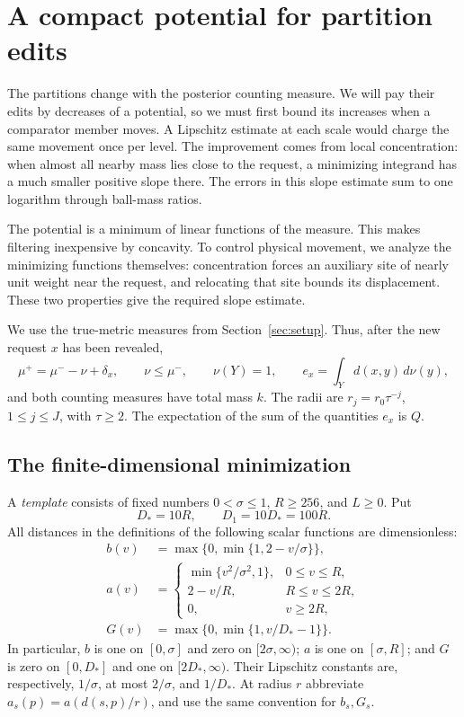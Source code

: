 \section{A compact potential for partition edits}
\label{sec:pilot}

The partitions change with the posterior counting measure.  We will pay
their edits by decreases of a potential, so we must first bound its increases
when a comparator member moves.  A Lipschitz estimate at each scale would
charge the same movement once per level.  The improvement comes from local
concentration: when almost all nearby mass lies close to the request, a
minimizing integrand has a much smaller positive slope there.  The errors
in this slope estimate sum to one logarithm through ball-mass ratios.

The potential is a minimum of linear functions of the measure.  This
makes filtering inexpensive by concavity.  To control physical movement,
we analyze the minimizing functions themselves: concentration forces an
auxiliary site of nearly unit weight near the request, and relocating
that site bounds its displacement.  These two properties give the required
slope estimate.

We use the true-metric measures from Section~\ref{sec:setup}.  Thus, after
the new request $x$ has been revealed,
\begin{equation}
 \mu^+=\mu^- -\nu+\delta_x,\qquad
 \nu\le\mu^-,\qquad \nu(Y)=1,\qquad
 e_x=\int_Y d(x,y)\,d\nu(y),
 \label{eq:pilot-mover}
\end{equation}
and both counting measures have total mass $k$.  The radii are
$r_j=r_0\tau^{-j}$, $1\le j\le J$, with $\tau\ge2$.  The expectation of
the sum of the quantities $e_x$ is $Q$.

\subsection{The finite-dimensional minimization}

A \emph{template} consists of fixed numbers $0<\sigma\le1$, $R\ge256$,
and $L\ge0$.  Put
\[
 D_*=10R,\qquad D_1=10D_*=100R.
\]
All distances in the definitions of the following scalar functions are
dimensionless:
\begin{align}
 b(v)&=\max\{0,\min\{1,2-v/\sigma\}\},\nonumber\\
 a(v)&=\begin{cases}
       \min\{v^2/\sigma^2,1\},&0\le v\le R,\\
       2-v/R,&R\le v\le2R,\\
       0,&v\ge2R,
       \end{cases}\nonumber\\
 G(v)&=\max\{0,\min\{1,v/D_*-1\}\}.
 \label{eq:pilot-bumps}
\end{align}
In particular, $b$ is one on $[0,\sigma]$ and zero on $[2\sigma,\infty)$;
$a$ is one on $[\sigma,R]$; and $G$ is zero on $[0,D_*]$ and one on
$[2D_*,\infty)$.  Their Lipschitz constants are, respectively,
$1/\sigma$, at most $2/\sigma$, and $1/D_*$.  At radius $r$ abbreviate
$a_s(p)=a(d(s,p)/r)$, and use the same convention for $b_s,G_s$.

